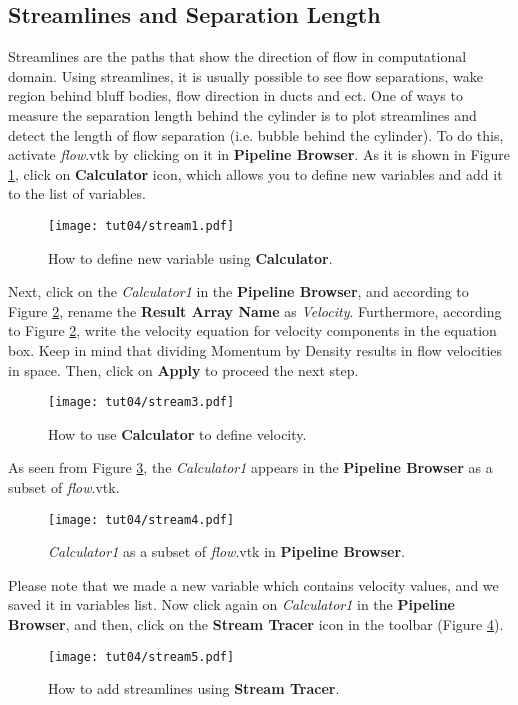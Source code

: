 \subsection{Streamlines and Separation Length}
Streamlines are the paths that show the direction of flow in computational domain. Using streamlines, it is usually possible to see flow separations, wake region behind bluff bodies, flow direction in ducts and ect. One of ways to measure the separation length behind the cylinder is to plot streamlines and detect the length of flow separation (i.e. bubble behind the cylinder). To do this, activate \textit{flow}.vtk by clicking on it in \textbf{Pipeline Browser}. As it is shown in Figure \ref{fig4:stream1_4}, click on \textbf{Calculator} icon, which allows you to define new variables and add it to the list of variables.
\begin{figure}[htbp]
    \centering
    \texttt{[image: tut04/stream1.pdf]}
    \caption{How to define new variable using \textbf{Calculator}.}
    \label{fig4:stream1_4}
\end{figure}
Next, click on the \textit{Calculator1} in the \textbf{Pipeline Browser}, and according to Figure \ref{fig4:stream3_4}, rename the \textbf{Result Array Name} as \textit{Velocity}. Furthermore, according to Figure \ref{fig4:stream3_4}, write the velocity equation for velocity components in the equation box. Keep in mind that dividing Momentum by Density results in flow velocities in space. Then, click on \textbf{Apply} to proceed the next step.
\begin{figure}[htbp]
    \centering
    \texttt{[image: tut04/stream3.pdf]}
    \caption{How to use \textbf{Calculator} to define velocity.}
    \label{fig4:stream3_4}
\end{figure}
As seen from Figure \ref{fig4:stream4_4}, the \textit{Calculator1} appears in the \textbf{Pipeline Browser} as a subset of \textit{flow}.vtk.
\begin{figure}[htbp]
    \centering
    \texttt{[image: tut04/stream4.pdf]}
    \caption{\textit{Calculator1} as a subset of \textit{flow}.vtk in \textbf{Pipeline Browser}.}
    \label{fig4:stream4_4}
\end{figure}
Please note that we made a new variable which contains velocity values, and we saved it in variables list. Now click again on \textit{Calculator1} in the \textbf{Pipeline Browser}, and then, click on the \textbf{Stream Tracer} icon in the toolbar (Figure \ref{fig4:stream5_4}).
\begin{figure}[htbp]
    \centering
    \texttt{[image: tut04/stream5.pdf]}
    \caption{How to add streamlines using \textbf{Stream Tracer}.}
    \label{fig4:stream5_4}
\end{figure}
